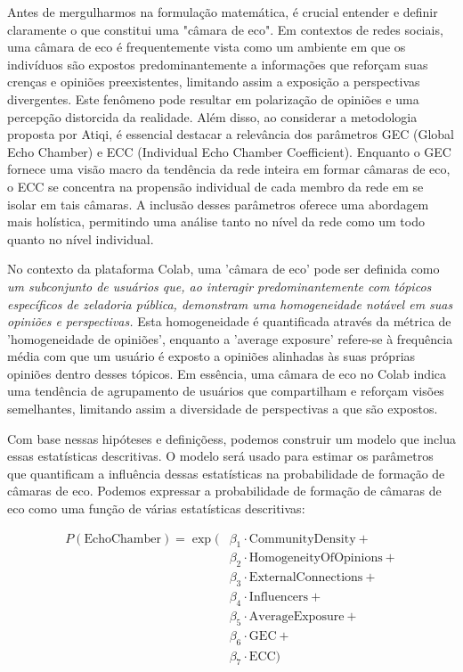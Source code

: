 Antes de mergulharmos na formulação matemática, é crucial entender e definir claramente o que constitui uma "câmara de eco". Em contextos de redes sociais, uma câmara de eco é frequentemente vista como um ambiente em que os indivíduos são expostos predominantemente a informações que reforçam suas crenças e opiniões preexistentes, limitando assim a exposição a perspectivas divergentes. Este fenômeno pode resultar em polarização de opiniões e uma percepção distorcida da realidade. Além disso, ao considerar a metodologia proposta por Atiqi, é essencial destacar a relevância dos parâmetros GEC (Global Echo Chamber) e ECC (Individual Echo Chamber Coefficient). Enquanto o GEC fornece uma visão macro da tendência da rede inteira em formar câmaras de eco, o ECC se concentra na propensão individual de cada membro da rede em se isolar em tais câmaras. A inclusão desses parâmetros oferece uma abordagem mais holística, permitindo uma análise tanto no nível da rede como um todo quanto no nível individual.

No contexto da plataforma Colab, uma 'câmara de eco' pode ser definida como \textit{um subconjunto de usuários que, ao interagir predominantemente com tópicos específicos de zeladoria pública, demonstram uma homogeneidade notável em suas opiniões e perspectivas.} Esta homogeneidade é quantificada através da métrica de 'homogeneidade de opiniões', enquanto a 'average exposure' refere-se à frequência média com que um usuário é exposto a opiniões alinhadas às suas próprias opiniões dentro desses tópicos. Em essência, uma câmara de eco no Colab indica uma tendência de agrupamento de usuários que compartilham e reforçam visões semelhantes, limitando assim a diversidade de perspectivas a que são expostos.

Com base nessas hipóteses e definiçõess, podemos construir um modelo que inclua essas estatísticas descritivas. O modelo será usado para estimar os parâmetros que quantificam a influência dessas estatísticas na probabilidade de formação de câmaras de eco. Podemos expressar a probabilidade de formação de câmaras de eco como uma função de várias estatísticas descritivas:

\begin{equation}
	\begin{split}
		P(\text{{EchoChamber}}) = \exp(&\beta_1 \cdot \text{{CommunityDensity}} + \\
		&\beta_2 \cdot \text{{HomogeneityOfOpinions}} + \\
		&\beta_3 \cdot \text{{ExternalConnections}} + \\
		&\beta_4 \cdot \text{{Influencers}} + \\
		&\beta_5 \cdot \text{{AverageExposure}} + \\
		&\beta_6 \cdot \text{{GEC}} + \\
		&\beta_7 \cdot \text{{ECC}})
	\end{split}
\end{equation}

